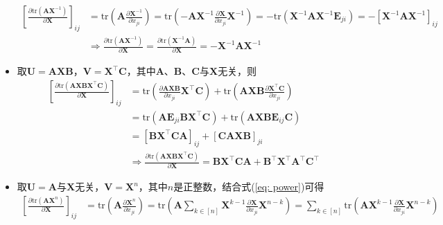 \documentclass{ctexart}
\theoremstyle{definition}
\def \Av {\mathbf{A}}
\def \Bv {\mathbf{B}}
\def \Cv {\mathbf{C}}
\def \Ev {\mathbf{E}}
\def \Uv {\mathbf{U}}
\def \Vv {\mathbf{V}}
\def \Xv {\mathbf{X}}
\def \tr {\mathrm{tr}}
\begin{document}
\begin{itemize}
          \begin{align*}
              \left[ \frac{\partial \tr(\Av \Xv^{-1})}{\partial \Xv} \right]_{ij} & = \tr \left( \Av \frac{\partial \Xv^{-1}}{\partial x_{ji}} \right) = \tr \left( - \Av \Xv^{-1} \frac{\partial \Xv}{\partial x_{ji}} \Xv^{-1} \right) = - \tr \left( \Xv^{-1} \Av \Xv^{-1} \Ev_{ji} \right) = - [\Xv^{-1} \Av \Xv^{-1}]_{ij} \\
                                                                                  & \Longrightarrow \frac{\partial \tr(\Av \Xv^{-1})}{\partial \Xv} = \frac{\partial \tr(\Xv^{-1} \Av)}{\partial \Xv} = - \Xv^{-1} \Av \Xv^{-1}
          \end{align*}
    \item 取$\Uv = \Av \Xv \Bv$，$\Vv = \Xv^\top \Cv$，其中$\Av$、$\Bv$、$\Cv$与$\Xv$无关，则
          \begin{align*}
              \left[ \frac{\partial \tr(\Av \Xv \Bv \Xv^\top \Cv)}{\partial \Xv} \right]_{ij} & = \tr \left( \frac{\partial \Av \Xv \Bv}{\partial x_{ji}} \Xv^\top \Cv \right) + \tr \left( \Av \Xv \Bv \frac{\partial \Xv^\top \Cv}{\partial x_{ji}} \right) \\
                                                                                              & = \tr \left( \Av \Ev_{ji} \Bv \Xv^\top \Cv \right) + \tr \left( \Av \Xv \Bv \Ev_{ij} \Cv \right)                                                              \\
                                                                                              & = [\Bv \Xv^\top \Cv \Av]_{ij} + [\Cv \Av \Xv \Bv]_{ji}                                                                                                        \\
                                                                                              & \Longrightarrow \frac{\partial \tr(\Av \Xv \Bv \Xv^\top \Cv)}{\partial \Xv} = \Bv \Xv^\top \Cv \Av + \Bv^\top \Xv^\top \Av^\top \Cv^\top
          \end{align*}
    \item 取$\Uv = \Av$与$\Xv$无关，$\Vv = \Xv^n$，其中$n$是正整数，结合式(\ref{eq: power})可得
          \begin{align*}
              \left[ \frac{\partial \tr(\Av \Xv^n)}{\partial \Xv} \right]_{ij} & = \tr \left( \Av \frac{\partial \Xv^n}{\partial x_{ji}} \right) = \tr \left( \Av \sum_{k \in [n]} \Xv^{k-1} \frac{\partial \Xv}{\partial x_{ji}} \Xv^{n-k} \right) = \sum_{k \in [n]} \tr \left( \Av \Xv^{k-1} \frac{\partial \Xv}{\partial x_{ji}} \Xv^{n-k} \right) \\

\end{align*}
\end{itemize}
\end{document}
